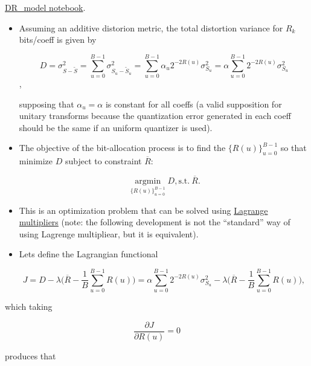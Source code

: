 \href{https://nbviewer.jupyter.org/github/vicente-gonzalez-ruiz/image_transformations_for_coding/blob/master/DR_model.ipynb}{DR\_model notebook}.
    
\begin{itemize}
\item
  Assuming an additive distorion metric, the total distortion variance
  for \(R_k\) bits/coeff is given by

  \begin{equation}
    D = \sigma_{S-\tilde{S}}^2 = \sum_{u=0}^{B-1} \sigma_{S_u-\tilde{S}_u}^2 = \sum_{u=0}^{B-1}\alpha_u 2^{-2R(u)}\sigma_{S_u}^2 = \alpha\sum_{u=0}^{B-1}2^{-2R(u)}\sigma_{S_u}^2
    \tag{$D$}
  \end{equation},

  supposing that \(\alpha_u = \alpha\) is constant for all coeffs (a
  valid supposition for unitary transforms because the quantization
  error generated in each coeff should be the same if an uniform
  quantizer is used).
\item
  The objective of the bit-allocation process is to find the
  \(\{R(u)\}_{u=0}^{B-1}\) so that minimize \(D\) subject to constraint
  \(\overline{R}\):

  \begin{equation}
    \underset{\{R(u)\}_{u=0}^{B-1}}{\operatorname{arg min}} D, \text{s.t.}~{\overline{R}}. 
  \end{equation}
\item
  This is an optimization problem that can be solved using
  \href{https://en.wikipedia.org/wiki/Lagrange_multiplier}{Lagrange
  multipliers} (note: the following development is not the ``standard''
  way of using Lagrenge multipliear, but it is equivalent).
\item
  Lets define the Lagrangian functional

  \begin{equation}
    J = D - \lambda\Big( \overline{R} - \frac{1}{B}\sum_{u=0}^{B-1}R(u) \Big)= \alpha \sum_{u=0}^{B-1} 2^{-2R(u)}\sigma_{S_u}^2 - \lambda \Big( \overline{R} - \frac{1}{B}\sum_{u=0}^{B-1}R(u) \Big),
  \end{equation}
\end{itemize}

which taking

\begin{equation}
    \frac{\partial J}{\partial R(u)} = 0
  \end{equation}

produces that

